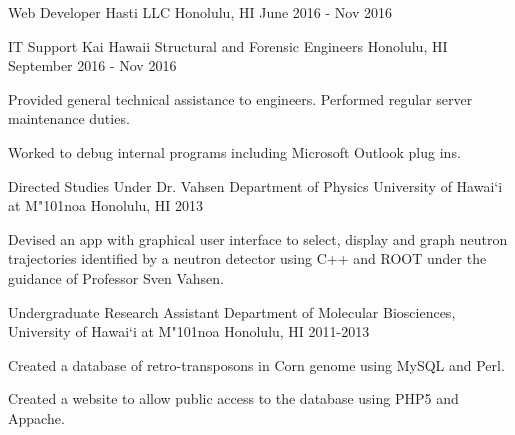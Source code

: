 \begin{cventries}
    \cventry
    {Web Developer}
    {Hasti LLC}
    {Honolulu, HI}
    {June 2016 - Nov 2016}
    {
        \begin{cvitems}
            \item {Developed a web application for AASHTO LRFD calculations (\textbf{\href{http://www.aashtobridgedesign.com}{aashtobridgedesign.com})}
        \end{cvitems}
    }

    \cventry
    {IT Support}
    {Kai Hawaii Structural and Forensic Engineers}
    {Honolulu, HI}
    {September 2016 - Nov 2016}
    {
	    \begin{cvitems}
		    \item{Provided general technical assistance to engineers. Performed regular server maintenance duties.}
		    \item{Worked to debug internal programs including Microsoft Outlook plug ins.}
	    \end{cvitems}	
    }
	
	\cventry
	{Directed Studies Under Dr. Vahsen}
	{Department of Physics University of Hawai`i at M{\char"101}noa}
	{Honolulu, HI}
	{2013}
	{
		\begin{cvitems}
			\item {Devised an app with graphical user interface to select, display and graph neutron trajectories identified by a neutron detector using C++ and
				ROOT under the guidance of Professor Sven Vahsen.}
		\end{cvitems}
	}

	\cventry
	{Undergraduate Research Assistant}
	{Department of Molecular Biosciences, University of Hawai`i at M{\char"101}noa}
	{Honolulu, HI}
	{2011-2013}
	{
		\begin{cvitems}
			\item {Created a database of retro-transposons in Corn genome using MySQL and Perl.}
			\item {Created a website to allow public access to the database using PHP5 and Appache.}
		\end{cvitems}
	}

\end{cventries}

